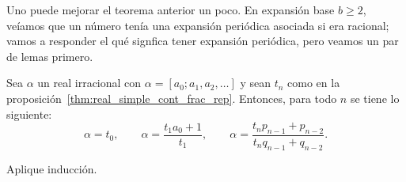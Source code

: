\documentclass[teoria-numeros.tex]{subfiles}
\begin{document}
Uno puede mejorar el teorema anterior un poco.
En expansión base $b \ge 2$, veíamos que un número tenía una expansión periódica asociada si era racional;
vamos a responder el qué signfica tener expansión periódica, pero veamos un par de lemas primero.
\begin{lem}
	Sea $\alpha$ un real irracional con $\alpha = [a_0; a_1, a_2, \dots]$ y sean $t_n$ como en la proposición~\ref{thm:real_simple_cont_frac_rep}.
	Entonces, para todo $n$ se tiene lo siguiente:
	$$ \alpha = t_0, \qquad \alpha = \frac{t_1 a_0 + 1}{t_1}, \qquad \alpha = \frac{t_n p_{n-1} + p_{n-2}}{t_n q_{n-1} + q_{n-2}}. $$
\end{lem}
\begin{hint}
	Aplique inducción.
\end{hint}
\end{document}
